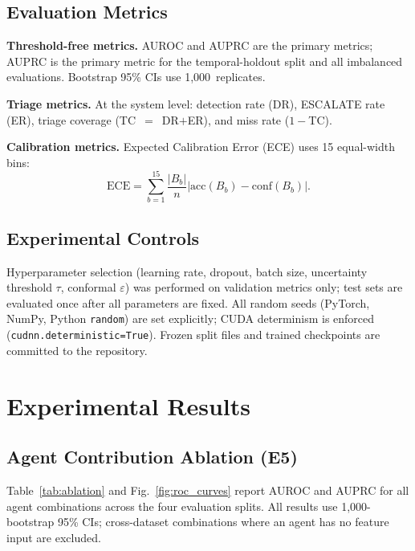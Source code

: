 \documentclass[journal]{IEEEtran}
\begin{document}
\subsection{Evaluation Metrics}

\textbf{Threshold-free metrics.}
AUROC and AUPRC are the primary metrics; AUPRC is the primary metric for the
temporal-holdout split and all imbalanced evaluations.
Bootstrap 95\% CIs use 1,000~replicates.

\textbf{Triage metrics.}
At the system level: detection rate (DR), ESCALATE rate (ER), triage coverage (TC~$=$~DR$+$ER),
and miss rate ($1-$TC).

\textbf{Calibration metrics.}
Expected Calibration Error (ECE) uses 15 equal-width bins:
\begin{equation}
\mathrm{ECE} = \sum_{b=1}^{15} \frac{|B_b|}{n}
    \bigl|\mathrm{acc}(B_b) - \mathrm{conf}(B_b)\bigr|.
\label{eq:ece}
\end{equation}

\subsection{Experimental Controls}

Hyperparameter selection (learning rate, dropout, batch size, uncertainty threshold
$\tau$, conformal $\varepsilon$) was performed on validation metrics only; test sets
are evaluated once after all parameters are fixed.
All random seeds (PyTorch, NumPy, Python \texttt{random}) are set explicitly;
CUDA determinism is enforced (\texttt{cudnn.deterministic=True}).
Frozen split files and trained checkpoints are committed to the repository.

\section{Experimental Results}
\label{sec:results}

\subsection{Agent Contribution Ablation (E5)}
\label{subsec:e5}

Table~\ref{tab:ablation} and Fig.~\ref{fig:roc_curves} report AUROC and AUPRC for all
agent combinations across the four evaluation splits.
All results use 1,000-bootstrap 95\% CIs; cross-dataset combinations where an agent has
no feature input are excluded.
\end{document}
